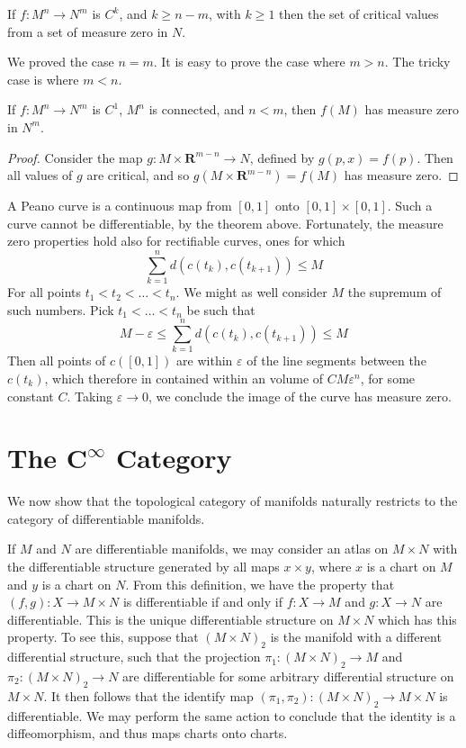 \begin{theorem}[Sard]
    If $f:M^n \to N^m$ is $C^k$, and $k \geq n-m$, with $k \geq 1$ then the set of critical values from a set of measure zero in $N$.
\end{theorem}

We proved the case $n = m$. It is easy to prove the case where $m > n$. The tricky case is where $m < n$.

\begin{theorem}
    If $f:M^n \to N^m$ is $C^1$, $M^n$ is connected, and $n < m$, then $f(M)$ has measure zero in $N^m$.
\end{theorem}
\begin{proof}
    Consider the map $g: M \times \mathbf{R}^{m-n} \to N$, defined by $g(p,x) = f(p)$. Then all values of $g$ are critical, and so $g(M \times \mathbf{R}^{m-n}) = f(M)$ has measure zero.
\end{proof}

A Peano curve is a continuous map from $[0,1]$ onto $[0,1] \times [0,1]$. Such a curve cannot be differentiable, by the theorem above. Fortunately, the measure zero properties hold also for rectifiable curves, ones for which
%
\[ \sum_{k = 1}^n d(c(t_k), c(t_{k+1})) \leq M \]
%
For all points $t_1 < t_2 < \dots < t_n$. We might as well consider $M$ the supremum of such numbers. Pick $t_1 < \dots < t_n$ be such that
%
\[ M - \varepsilon \leq \sum_{k = 1}^n d(c(t_k), c(t_{k+1})) \leq M \]
%
Then all points of $c([0,1])$ are within $\varepsilon$ of the line segments between the $c(t_k)$, which therefore in contained within an volume of $C M \varepsilon^n$, for some constant $C$. Taking $\varepsilon \to 0$, we conclude the image of the curve has measure zero.




\section{The $\mathbf{C^\infty}$ Category}

We now show that the topological category of manifolds naturally restricts to the category of differentiable manifolds.

\begin{example}
    If $M$ and $N$ are differentiable manifolds, we may consider an atlas on $M \times N$ with the differentiable structure generated by all maps $x \times y$, where $x$ is a chart on $M$ and $y$ is a chart on $N$. From this definition, we have the property that $(f,g): X \to M \times N$ is differentiable if and only if $f: X \to M$ and $g: X \to N$ are differentiable. This is the unique differentiable structure on $M \times N$ which has this property. To see this, suppose that $(M \times N)_2$ is the manifold with a different differential structure, such that the projection $\pi_1: (M \times N)_2 \to M$ and $\pi_2: (M \times N)_2 \to N$ are differentiable for some arbitrary differential structure on $M \times N$. It then follows that the identify map $(\pi_1, \pi_2) : (M \times N)_2 \to M \times N$ is differentiable. We may perform the same action to conclude that the identity is a diffeomorphism, and thus maps charts onto charts.
\end{example}

